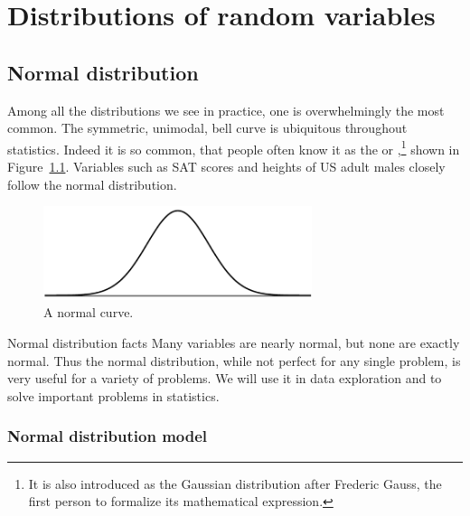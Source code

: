 \chapter{Distributions of random variables}
\label{ch_distributions}
\renewcommand{\chapterfolder}{ch_distributions}




\section{Normal distribution}
\label{normalDist}


Among all the distributions we see in practice, one is overwhelmingly the most common. The symmetric, unimodal, bell curve is ubiquitous throughout statistics. Indeed it is so common, that people often know it as the  or ,\footnote{It is also introduced as the Gaussian distribution after Frederic Gauss, the first person to formalize its mathematical expression.} shown in Figure~\ref{simpleNormal}. Variables such as SAT scores and heights of US adult males closely follow the normal distribution.

\begin{figure}[h]
\centering
\includegraphics[width=0.7\textwidth]{ch_distributions/figures/simpleNormal/simpleNormal}
\caption{A normal curve.}
\label{simpleNormal}
\end{figure}

\begin{onebox}{Normal distribution facts}
Many variables are nearly normal, but none are exactly normal. Thus the normal distribution, while not perfect for any single problem, is very useful for a variety of problems. We will use it in data exploration and to solve important problems in statistics.
\end{onebox}


\subsection{Normal distribution model}

